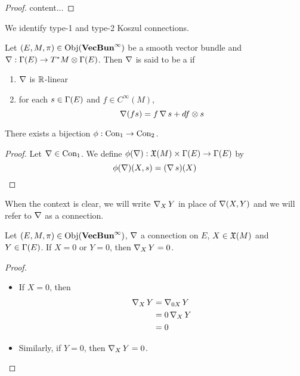\documentclass{book}
\begin{document}
	\begin{proof}
		content...
	\end{proof}

	\begin{note}
		We identify type-1 and type-2 Koszul connections.	
	\end{note}

	\begin{defn}
		Let $(E, M, \pi) \in \operatorname{Obj}(\operatorname*{\text{\textbf{VecBun}}^{\infty}})$ be a smooth vector bundle and $\operatorname{\nabla} : \Gamma(E) \rightarrow T^*M \otimes \Gamma(E)$. Then $\operatorname{\nabla}$ is said to be a  if 
		\begin{enumerate}
			\item $\operatorname{\nabla}$ is $\mathbb{R}$-linear
			\item for each $s \in \Gamma(E)$ and $f \in C^{\infty}(M)$, 
			$$\operatorname{\nabla}(fs) = f \operatorname{\nabla} s + df \otimes s $$ 
		\end{enumerate}
	\end{defn}

	\begin{ex}
		There exists a bijection $\phi:  \text{Con}_1 \rightarrow \text{Con}_2$.
	\end{ex}

	\begin{proof}
		Let $\operatorname{\nabla} \in \text{Con}_1$. We define $\phi(\operatorname{\nabla}): \mathfrak{X}(M) \times \Gamma(E) \rightarrow \Gamma(E)$ by $$\phi(\operatorname{\nabla})(X, s) = (\operatorname{\nabla} s)(X)$$
	\end{proof}

	\begin{note}
		When the context is clear, we will write $\operatorname{\nabla}_X Y$ in place of $\operatorname{\nabla}(X,Y)$ and we will refer to $\operatorname{\nabla}$ as a connection.
	\end{note}

	\begin{ex}
		Let $(E, M, \pi) \in \operatorname{Obj}(\operatorname*{\text{\textbf{VecBun}}^{\infty}})$, $\operatorname{\nabla}$ a connection on $E$, $X \in \mathfrak{X}(M)$ and $Y \in \Gamma(E)$. If $X = 0$ or $Y = 0$, then $\operatorname{\nabla}_X Y = 0$.
	\end{ex}

	\begin{proof}\
		\begin{itemize}
			\item If $X = 0$, then 
			\begin{align*}
				\operatorname{\nabla}_X Y
				& = \operatorname{\nabla}_{0 X} Y \\
				& = 0 \operatorname{\nabla}_X Y \\
				& = 0
			\end{align*}
			\item Similarly, if $Y = 0$, then $\operatorname{\nabla}_X Y = 0$.
		\end{itemize}
	\end{proof}
\end{document}
